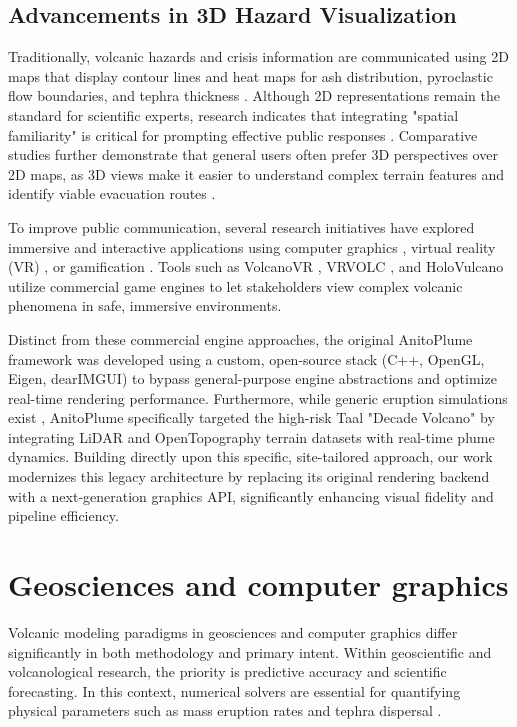 \subsection{Advancements in 3D Hazard Visualization}
Traditionally, volcanic hazards and crisis information are communicated using 2D maps that display contour lines and heat maps for ash distribution, pyroclastic flow boundaries, and tephra thickness \cite{nave2010re, thompson2015influence, fearnley2018volcano, EspostiOngaro2020Validation}. 
Although 2D representations remain the standard for scientific experts, research indicates that integrating "spatial familiarity" is critical for prompting effective public responses \cite{preppernau2015three}. 
Comparative studies further demonstrate that general users often prefer 3D perspectives over 2D maps, as 3D views make it easier to understand complex terrain features and identify viable evacuation routes \cite{thompson2017more, driedger2024following}.

To improve public communication, several research initiatives have explored immersive and interactive applications using computer graphics \cite{zhang2017hybrid, lastic2022interactive, pretorius2024volcanic}, virtual reality (VR) \cite{tibaldi2020real, asgary2019simulation, li2023synthesizing}, or gamification \cite{kerlow2020earth}.
Tools such as VolcanoVR \cite{hansen2025volcanovr}, VRVOLC \cite{delage2021visualising}, and HoloVulcano \cite{asgary2019simulation} utilize commercial game engines to let stakeholders view complex volcanic phenomena in safe, immersive environments.

Distinct from these commercial engine approaches, the original AnitoPlume framework was developed using a custom, open-source stack (C++, OpenGL, Eigen, dearIMGUI) to bypass general-purpose engine abstractions and optimize real-time rendering performance. 
Furthermore, while generic eruption simulations exist \cite{lastic2022interactive, pretorius2024volcanic}, AnitoPlume specifically targeted the high-risk Taal "Decade Volcano" by integrating LiDAR and OpenTopography terrain datasets with real-time plume dynamics. 
Building directly upon this specific, site-tailored approach, our work modernizes this legacy architecture by replacing its original rendering backend with a next-generation graphics API, significantly enhancing visual fidelity and pipeline efficiency.
\section{Geosciences and computer graphics}
Volcanic modeling paradigms in geosciences and computer graphics differ significantly in both methodology and primary intent.
Within geoscientific and volcanological research, the priority is predictive accuracy and scientific forecasting. In this context, numerical solvers are essential for quantifying physical parameters such as mass eruption rates and tephra dispersal \cite{kavanagh2018review, poland2020partly, EspostiOngaro2020Validation}.

